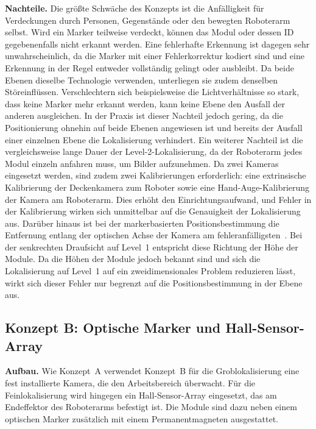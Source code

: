 \textbf{Nachteile.} Die größte Schwäche des Konzepts ist die Anfälligkeit für Verdeckungen durch Personen, Gegenstände oder den bewegten Roboterarm selbst. Wird ein Marker teilweise verdeckt, können das Modul oder dessen ID gegebenenfalls nicht erkannt werden. Eine fehlerhafte Erkennung ist dagegen sehr unwahrscheinlich, da die Marker mit einer Fehlerkorrektur kodiert sind und eine Erkennung in der Regel entweder vollständig gelingt oder ausbleibt. Da beide Ebenen dieselbe Technologie verwenden, unterliegen sie zudem denselben Störeinflüssen. Verschlechtern sich beispielsweise die Lichtverhältnisse so stark, dass keine Marker mehr erkannt werden, kann keine Ebene den Ausfall der anderen ausgleichen. In der Praxis ist dieser Nachteil jedoch gering, da die Positionierung ohnehin auf beide Ebenen angewiesen ist und bereits der Ausfall einer einzelnen Ebene die Lokalisierung verhindert. Ein weiterer Nachteil ist die vergleichsweise lange Dauer der Level-2-Lokalisierung, da der Roboterarm jedes Modul einzeln anfahren muss, um Bilder aufzunehmen.
 Da zwei Kameras eingesetzt werden, sind zudem zwei Kalibrierungen erforderlich: eine extrinsische Kalibrierung der Deckenkamera zum Roboter sowie eine Hand-Auge-Kalibrierung der Kamera am Roboterarm. Dies erhöht den Einrichtungsaufwand, und Fehler in der Kalibrierung wirken sich unmittelbar auf die Genauigkeit der Lokalisierung aus. Darüber hinaus ist bei der markerbasierten Positionsbestimmung die Entfernung entlang der optischen Achse der Kamera am fehleranfälligsten~\cite{TODO}. Bei der senkrechten Draufsicht auf Level~1 entspricht diese Richtung der Höhe der Module. Da die Höhen der Module jedoch bekannt sind und sich die Lokalisierung auf Level~1 auf ein zweidimensionales Problem reduzieren lässt, wirkt sich dieser Fehler nur begrenzt auf die Positionsbestimmung in der Ebene aus.

\subsection{Konzept B: Optische Marker und Hall-Sensor-Array}
\label{subsec:konzeptB}

\textbf{Aufbau.} Wie Konzept~A verwendet Konzept~B für die Groblokalisierung eine fest installierte Kamera, die den Arbeitsbereich überwacht. Für die Feinlokalisierung wird hingegen ein Hall-Sensor-Array eingesetzt, das am Endeffektor des Roboterarms befestigt ist. Die Module sind dazu neben einem optischen Marker zusätzlich mit einem Permanentmagneten ausgestattet.

